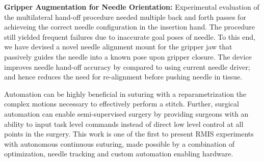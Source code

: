 \documentclass[0-suturing.tex]{subfiles}
\begin{document}
\noindent \textbf{Gripper Augmentation for Needle Orientation: }
Experimental evaluation of the multilateral hand-off procedure needed multiple back and forth passes for achieveing the correct needle configuration in the insertion hand. The procedure still yielded frequent failures due to inaccurate goal poses of needle. To this end, we have devised a novel needle alignment mount for the gripper jaw that passively guides the needle into a known pose upon gripper closure. The device improves needle hand-off accuracy by  compared to using current needle driver; and hence reduces the need for re-alignment before pushing needle in tissue.  

Automation can be highly beneficial in suturing with a reparametrization the complex motions necessary to effectively perform a stitch. Further, surgical automation can enable semi-supervised surgery by providing surgeons with an ability to input task level commands instead of direct low level control at all points in the surgery. This work is one of the first to present RMIS experiments with autonomous continuous suturing, made possible by a combination of optimization, needle tracking and custom automation enabling hardware.








\end{document}
